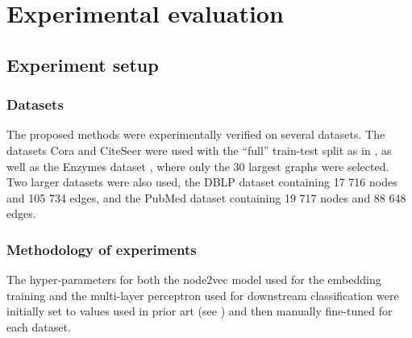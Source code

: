 \section{Experimental evaluation}

\subsection{Experiment setup}

\subsubsection{Datasets}

The proposed methods were experimentally verified on several datasets. The datasets Cora and CiteSeer \cite{yang_revisiting_2016} were used with the \enquote{full} train-test split as in \cite{chen_fastgcn_2018}, as well as the Enzymes dataset \cite{morris_tudataset_2020}, where only the 30 largest graphs were selected. Two larger datasets were also used, the DBLP dataset \cite{bojchevski_deep_2018} containing 17 716 nodes and 105 734 edges, and the PubMed dataset \cite{yang_revisiting_2016} containing 19 717 nodes and 88 648 edges.

\subsubsection{Methodology of experiments}

The hyper-parameters for both the node2vec model used for the embedding training and the multi-layer perceptron used for downstream classification were initially set to values used in prior art (see \cite{fey_fast_2019, hu_open_2021}) and then manually fine-tuned for each dataset.

